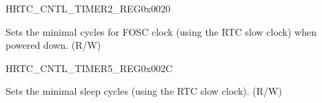 \begin{register}{H}{RTC\_CNTL\_TIMER2\_REG}{0x0020}\label{regdesc:RTCCNTLTIMER2REG}
%
%
\regnewline%
\begin{regdesc}\begin{reglist}
\label{fielddesc:RTCCNTLMINTIMEFOSCOFF}\item [RTC\_CNTL\_MIN\_TIME\_FOSC\_OFF] Sets the minimal cycles for FOSC clock (using the RTC slow clock) when powered down. (R/W)
\end{reglist}\end{regdesc}
\end{register}

\begin{register}{H}{RTC\_CNTL\_TIMER5\_REG}{0x002C}\label{regdesc:RTCCNTLTIMER5REG}
%
%
%
\regnewline%
\begin{regdesc}\begin{reglist}
\label{fielddesc:RTCCNTLMINSLPVAL}\item [RTC\_CNTL\_MIN\_SLP\_VAL] Sets the minimal sleep cycles (using the RTC slow clock). (R/W)
\end{reglist}\end{regdesc}
\end{register}


